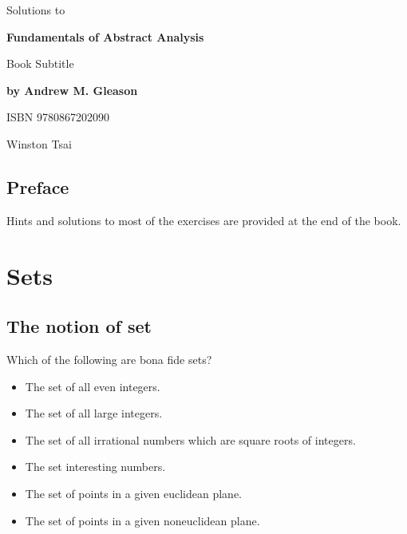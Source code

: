 \documentclass{report}
\begin{document}
\begin{titlepage}
  \begin{center}
    \vspace*{1cm}
    \LARGE
    Solutions to

    \vspace{0.5cm}

    \Huge
    \textbf{Fundamentals of Abstract Analysis}

    \huge
    Book Subtitle

    \LARGE
    \textbf{by Andrew M. Gleason}

    \vspace{0.2cm}

    \large
    ISBN 9780867202090

    \vfill

    \LARGE{Winston Tsai}
  \end{center}
\end{titlepage}
\newpage

\section*{Preface}
Hints and solutions to most of the exercises are provided at the end of the book.

\newpage
\tableofcontents
\newpage

\chapter{Sets}

\section{The notion of set}

\begin{exercise}
Which of the following are bona fide sets?
\begin{itemize}
    \item The set of all even integers.
    \item The set of all large integers.
    \item The set of all irrational numbers which are square roots of integers.
    \item The set interesting numbers.
    \item The set of points in a given euclidean plane.
    \item The set of points in a given noneuclidean plane.
\end{itemize}
\end{exercise}
\end{document}

